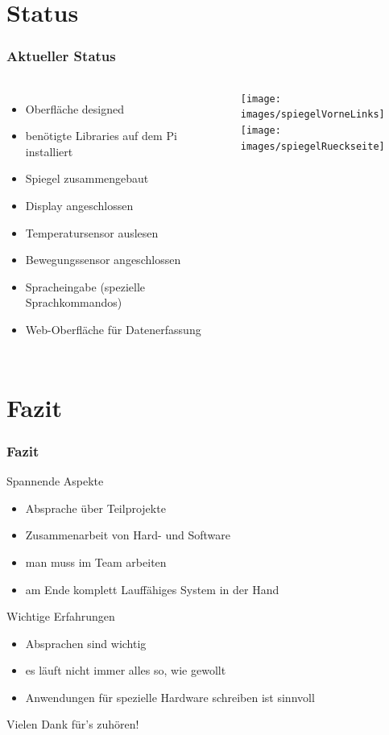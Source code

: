 \documentclass[11pt]{beamer}
\newcommand{\cmark}{\ding{51}}%
\newcommand{\xmark}{\ding{55}}%
\begin{document}
	\section{Status}
	\begin{frame}
		\frametitle{Aktueller Status}
			\begin{columns}
				\column{.5\paperwidth}
					\begin{itemize}
						\item[\cmark] Oberfl\"ache designed
						\item[\cmark] ben\"otigte Libraries auf dem Pi installiert
						\item[\cmark] Spiegel zusammengebaut
						\item[\cmark] Display angeschlossen
						\item[\cmark] Temperatursensor auslesen
						\item[\xmark] Bewegungssensor angeschlossen
						\item Spracheingabe (spezielle Sprachkommandos)
						\item Web-Oberfl\"ache f\"ur Datenerfassung
					\end{itemize}
				\column{.4\paperwidth}
					\texttt{[image: images/spiegelVorneLinks]}\\
					\vspace{.3cm}
					\texttt{[image: images/spiegelRueckseite]}
			\end{columns}
	\end{frame}
	
	\section{Fazit}
	\begin{frame}
		\frametitle{Fazit}
		\centering
		\begin{block}{Spannende Aspekte}
			\begin{itemize}
				\item Absprache \"uber Teilprojekte
				\item Zusammenarbeit von Hard- und Software
				\item man muss im Team arbeiten
				\item am Ende komplett Lauff\"ahiges System in der Hand
			\end{itemize}
		\end{block}
		\pause
		\begin{block}{Wichtige Erfahrungen}
			\begin{itemize}
				\item Absprachen sind wichtig
				\item es l\"auft nicht immer alles so, wie gewollt
				\item Anwendungen f\"ur spezielle Hardware schreiben ist sinnvoll
			\end{itemize}
		\end{block}
	\end{frame}
	\begin{frame}
		\huge
		\begin{center}
			\vfill
			Vielen Dank für's zuhören!
			\vfill
		\end{center}
	\end{frame}
\end{document}
